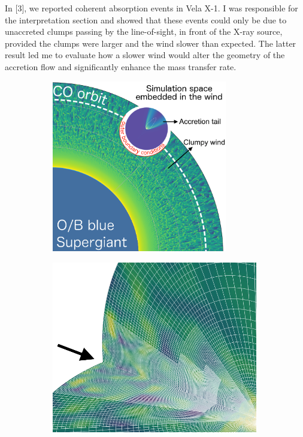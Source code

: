 \documentclass[letterpaper,12pt,onecolumn]{article}
\begin{document}
In [3], we reported coherent absorption events in Vela X-1. I was responsible for the interpretation section and showed that these events could only be due to unaccreted clumps passing by the line-of-sight, in front of the X-ray source, provided the clumps were larger and the wind slower than expected. The latter result led me to evaluate how a slower wind would alter the geometry of the accretion flow and significantly enhance the mass transfer rate.

\begin{figure}[!t]
  \hspace*{-1.7cm}
\begin{subfigure}{0.45\columnwidth}
  \includegraphics[height=7.5cm]{Figures/config_SgXB_clumps.png}	
\end{subfigure}%
\begin{subfigure}{0.45\columnwidth}
  \hspace*{0.2cm}
  \includegraphics[height=7.5cm]{Figures/mesh.jpeg}	

\end{subfigure}
\end{figure}
\end{document}
